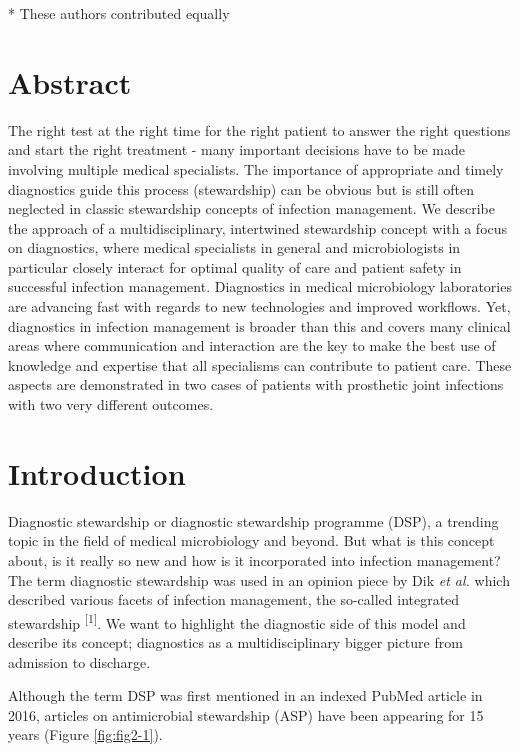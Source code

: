 \documentclass[
]{book}
\begin{document}
* These authors contributed equally

\hypertarget{abstract}{%
\section*{Abstract}\label{abstract}}

The right test at the right time for the right patient to answer the right questions and start the right treatment - many important decisions have to be made involving multiple medical specialists. The importance of appropriate and timely diagnostics guide this process (stewardship) can be obvious but is still often neglected in classic stewardship concepts of infection management. We describe the approach of a multidisciplinary, intertwined stewardship concept with a focus on diagnostics, where medical specialists in general and microbiologists in particular closely interact for optimal quality of care and patient safety in successful infection management. Diagnostics in medical microbiology laboratories are advancing fast with regards to new technologies and improved workflows. Yet, diagnostics in infection management is broader than this and covers many clinical areas where communication and interaction are the key to make the best use of knowledge and expertise that all specialisms can contribute to patient care. These aspects are demonstrated in two cases of patients with prosthetic joint infections with two very different outcomes.

\hypertarget{introduction}{%
\section{Introduction}\label{introduction}}

Diagnostic stewardship or diagnostic stewardship programme (DSP), a trending topic in the field of medical microbiology and beyond. But what is this concept about, is it really so new and how is it incorporated into infection management? The term diagnostic stewardship was used in an opinion piece by Dik \emph{et al.} which described various facets of infection management, the so-called integrated stewardship \textsuperscript{{[}1{]}}. We want to highlight the diagnostic side of this model and describe its concept; diagnostics as a multidisciplinary bigger picture from admission to discharge.

Although the term DSP was first mentioned in an indexed PubMed article in 2016, articles on antimicrobial stewardship (ASP) have been appearing for 15 years (Figure \ref{fig:fig2-1}).
\end{document}

